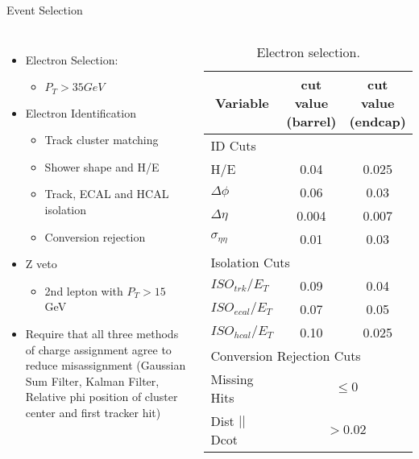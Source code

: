 \documentclass[t, 8pt]{beamer}
\begin{document}
\begin{frame}{Event Selection}
  \begin{columns}[c]
  \begin{itemize}
    \item Electron Selection:
    \begin{itemize}
      \item $P_T > 35 GeV$
    \end{itemize}
    \item Electron Identification
    \begin{itemize}
      \item Track cluster matching
      \item Shower shape and H/E
      \item Track, ECAL and HCAL isolation
      \item Conversion rejection
    \end{itemize}
    \item Z veto
    \begin{itemize}
      \item 2nd lepton with $P_T > 15$ GeV
    \end{itemize}
    \item Require that all three methods of charge assignment agree to reduce
    misassignment (Gaussian Sum Filter, Kalman Filter, Relative phi position of
    cluster center and first tracker hit)
  \end{itemize}
    \tiny{
  \begin{center}
    \begin{table}[htbp]
    \begin{tabular}{|lcc|} \hline
      \multicolumn{1}{|c}{Variable} & \multicolumn{1}{c}{cut value (barrel)}& \multicolumn{1}{c|}{cut value (endcap)}\\
        \hline   \hline
       \multicolumn{3}{|l|}{ID Cuts}\\ \hline
        H/E & 0.04 & 0.025 \\
        $\Delta\phi$ & 0.06 & 0.03 \\
        $\Delta\eta$ & 0.004 & 0.007  \\
        $\sigma_{\eta\eta}$ & 0.01 & 0.03 \\ \hline
      \multicolumn{3}{|l|}{Isolation Cuts}\\ \hline
       $ISO_{trk} / E_T $  & 0.09 & 0.04 \\
       $ISO_{ecal}/ E_T$  & 0.07 & 0.05 \\
       $ISO_{hcal}/ E_T$  & 0.10 & 0.025 \\ \hline
      \multicolumn{3}{|l|}{Conversion Rejection Cuts}\\ \hline
       Missing Hits  & \multicolumn{2}{c|}{$\leq 0$}\\
       Dist $||$ Dcot   & \multicolumn{2}{c|}{$>0.02$}\\
      \hline
    \end{tabular}
    \caption{\label{tab:elecuts} Electron selection.}%
    \end{table}


\end{center}}
\end{columns}
\end{frame}
\end{document}
